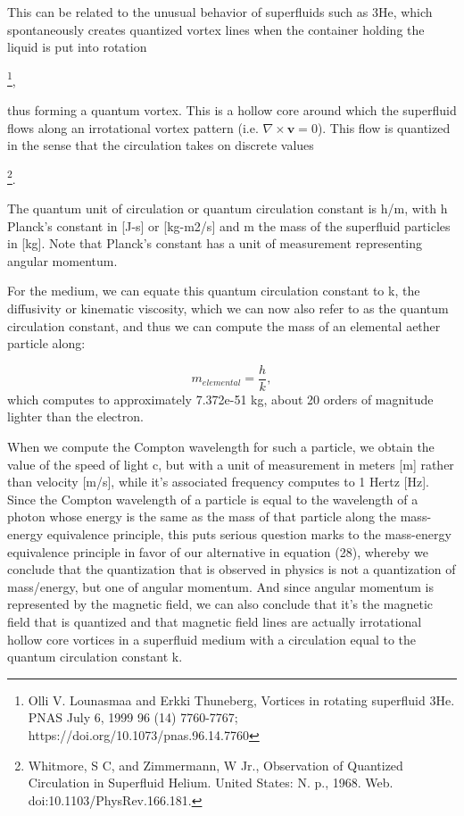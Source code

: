 \documentclass[twoside,final]{article}
\begin{document}
{This can be related to the unusual behavior of superfluids such as 3He, which
spontaneously creates quantized vortex lines when the container holding the
liquid is put into rotation

\footnote{  Olli V. Lounasmaa and Erkki Thuneberg,
Vortices in rotating superfluid 3He. PNAS July 6, 1999 96 (14) 7760-7767;
https://doi.org/10.1073/pnas.96.14.7760 \par }, 

thus forming a quantum vortex.
This is a hollow core around which the superfluid flows along an irrotational
vortex pattern (i.e. $\nabla \times \boldsymbol v=0$). This flow is
quantized in the sense that the circulation takes on discrete values

\footnote{
Whitmore, S C, and Zimmermann, W Jr., Observation of Quantized Circulation in
Superfluid Helium. United States: N. p., 1968. Web. doi:10.1103/PhysRev.166.181.
\par }. 

The quantum unit of circulation or quantum circulation constant is h/m,
with h Planck's constant in [J-s] or [kg-m2/s] and m the mass of the superfluid
particles in [kg].  Note that Planck{}'s constant has a unit of measurement
representing angular momentum.

For the medium, we can equate this quantum circulation constant to k, the
diffusivity or kinematic viscosity, which we can now also refer to as the
quantum circulation constant, and thus we can compute the mass of an elemental
aether particle along:

\begin{equation}
m_{\mathit{elemental}}=\frac h k,
\end{equation}
which computes to approximately 7.372e-51 kg, about 20 orders of magnitude
lighter than the electron. 

When we compute the Compton wavelength for such a particle, we obtain the value
of the speed of light c, but with a unit of measurement in meters [m] rather
than velocity [m/s], while it's associated frequency computes to 1 Hertz [Hz].
Since the Compton wavelength of a particle is equal to the wavelength of a
photon whose energy is the same as the mass of that particle along the
mass-energy equivalence principle, this puts serious question marks to the
mass-energy equivalence principle in favor of our alternative in equation (28),
whereby we conclude that the quantization that is observed in physics is not a
quantization of mass/energy, but one of angular momentum. And since angular
momentum is represented by the magnetic field, we can also conclude that it's
the magnetic field that is quantized and that magnetic field lines are actually
irrotational hollow core vortices in a superfluid medium with a circulation
equal to the quantum circulation constant k. 




}
\end{document}
